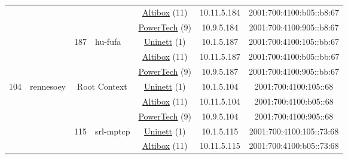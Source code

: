 \begin{small}
\begin{center}
\begin{longtable}{|c|c|c|c|c|c|c|c|}
  &  &  &  & \multicolumn{2}{|c|}{\tiny{\href{https://www.altibox.no}{Altibox} (11)}} & \tiny{10.11.5.184} & \tiny{2001:700:4100:b05::b8:67} \\* \cline{5-5}\cline{6-6}\cline{7-7}\cline{8-8}
  &  &  &  & \multicolumn{2}{|c|}{\tiny{\href{http://www.powertech.no}{PowerTech} (9)}} & \tiny{10.9.5.184} & \tiny{2001:700:4100:905::b8:67} \\* \cline{3-3}\cline{4-4}\cline{5-5}\cline{6-6}\cline{7-7}\cline{8-8}
  &  & \multirow{3}{*}{\tiny{187}} & \multicolumn{1}{|l|}{\multirow{3}{*}{\tiny{hu-fufa}}} & \multicolumn{2}{|c|}{\tiny{\href{https://www.uninett.no}{Uninett} (1)}} & \tiny{10.1.5.187} & \tiny{2001:700:4100:105::bb:67} \\* \cline{5-5}\cline{6-6}\cline{7-7}\cline{8-8}
  &  &  &  & \multicolumn{2}{|c|}{\tiny{\href{https://www.altibox.no}{Altibox} (11)}} & \tiny{10.11.5.187} & \tiny{2001:700:4100:b05::bb:67} \\* \cline{5-5}\cline{6-6}\cline{7-7}\cline{8-8}
  &  &  &  & \multicolumn{2}{|c|}{\tiny{\href{http://www.powertech.no}{PowerTech} (9)}} & \tiny{10.9.5.187} & \tiny{2001:700:4100:905::bb:67} \\ \hline
 \multirow{48}{*}{\tiny{104}} & \multicolumn{1}{|l|}{\multirow{48}{*}{\tiny{rennesoey}}} & \multicolumn{2}{|c|}{\multirow{3}{*}{\tiny{Root Context}}} & \multicolumn{2}{|c|}{\tiny{\href{https://www.uninett.no}{Uninett} (1)}} & \tiny{10.1.5.104} & \tiny{2001:700:4100:105::68} \\* \cline{5-5}\cline{6-6}\cline{7-7}\cline{8-8}
  &  & \multicolumn{2}{|c|}{} & \multicolumn{2}{|c|}{\tiny{\href{https://www.altibox.no}{Altibox} (11)}} & \tiny{10.11.5.104} & \tiny{2001:700:4100:b05::68} \\* \cline{5-5}\cline{6-6}\cline{7-7}\cline{8-8}
  &  & \multicolumn{2}{|c|}{} & \multicolumn{2}{|c|}{\tiny{\href{http://www.powertech.no}{PowerTech} (9)}} & \tiny{10.9.5.104} & \tiny{2001:700:4100:905::68} \\* \cline{3-3}\cline{4-4}\cline{5-5}\cline{6-6}\cline{7-7}\cline{8-8}
  &  & \multirow{3}{*}{\tiny{115}} & \multicolumn{1}{|l|}{\multirow{3}{*}{\tiny{srl-mptcp}}} & \multicolumn{2}{|c|}{\tiny{\href{https://www.uninett.no}{Uninett} (1)}} & \tiny{10.1.5.115} & \tiny{2001:700:4100:105::73:68} \\* \cline{5-5}\cline{6-6}\cline{7-7}\cline{8-8}
  &  &  &  & \multicolumn{2}{|c|}{\tiny{\href{https://www.altibox.no}{Altibox} (11)}} & \tiny{10.11.5.115} & \tiny{2001:700:4100:b05::73:68} \\* \cline{5-5}\cline{6-6}\cline{7-7}\cline{8-8}

\end{longtable}
\end{center}
\end{small}
